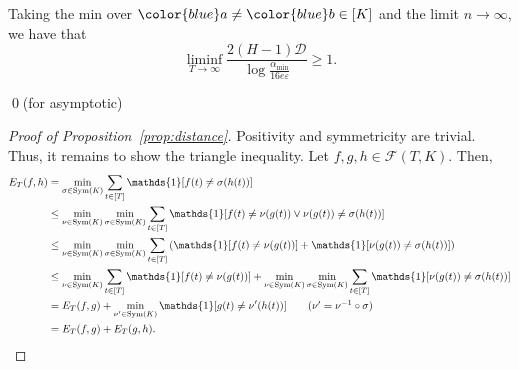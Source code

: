 \documentclass[twoside]{article}
\def\gD{{\mathcal{D}}}
\def\gF{{\mathcal{F}}}
\theoremstyle{plain}
\newcommand{\indicator}{\mathds{1}}
\newcommand{\Sym}{\mathrm{Sym}}
\begin{document}
Taking the min over ${\color{blue}a} \neq {\color{blue}b} \in [K]$ and the limit $n \rightarrow \infty$, we have that
\begin{equation}
    \liminf_{T \rightarrow \infty} \frac{2 (H - 1) \gD}{\log \frac{\alpha_{\min}}{16e \varepsilon}} \geq 1.
\end{equation}


\qed(for asymptotic)










\begin{proof}[Proof of Proposition~\ref{prop:distance}]
    Positivity and symmetricity are trivial. Thus, it remains to show the triangle inequality.
    Let $f, g, h \in \gF(T, K)$.
    Then,
    \begin{align*}
        E_T(f, h) &= \min_{\sigma \in \Sym(K)} \sum_{t \in [T]} \indicator[f(t) \neq \sigma(h(t))] \\
        &\leq \min_{\nu \in \Sym(K)} \min_{\sigma \in \Sym(K)} \sum_{t \in [T]} \indicator[f(t) \neq \nu(g(t)) \vee \nu(g(t)) \neq \sigma(h(t))] \\
        &\leq \min_{\nu \in \Sym(K)} \min_{\sigma \in \Sym(K)} \sum_{t \in [T]} \left( \indicator[f(t) \neq \nu(g(t))] + \indicator[\nu(g(t)) \neq \sigma(h(t))] \right) \\
        &\leq  \min_{\nu \in \Sym(K)} \sum_{t \in [T]}  \indicator[f(t) \neq \nu(g(t))] + \min_{\nu \in \Sym(K)} \min_{\sigma \in \Sym(K)} \sum_{t \in [T]} \indicator[\nu(g(t)) \neq \sigma(h(t))] \\
        &= E_T(f, g) + \min_{\nu' \in \Sym(K)} \indicator[g(t) \neq \nu'(h(t))] \tag{$\nu' = \nu^{-1} \circ \sigma$} \\
        &= E_T(f, g) + E_T(g, h).
    \end{align*}
\end{proof}

    











\newpage
\end{document}
